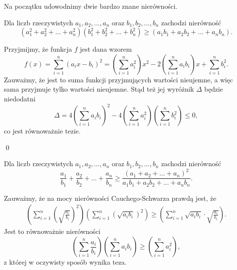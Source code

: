 

\noindent
Na początku udowodnimy dwie bardzo znane nierówności. 

\vspace{10px}


\noindent
Dla liczb rzeczywistych $a_1, a_2, ..., a_n$ oraz $b_1, b_2, ..., b_n$ zachodzi nierówność
\[
	\left(a_1^2 + a_2^2 + ... + a_n^2\right)\left(b_1^2 + b_2^2 + ... + b_n^2\right) \geqslant \left(a_1b_1 + a_2b_2 + ... + a_nb_n\right).
\]


\noindent
Przyjmijmy, że funkcja $f$ jest dana wzorem
\[
	f(x) = \sum^{n}_{i=1} (a_ix - b_i)^2 = \left(\sum^{n}_{i=1} a_i^2\right) x^2 - 2\left(\sum^{n}_{i=1} a_ib_i\right) x + \sum^{n}_{i=1} b_i^2.
\]
Zauważmy, że jest to suma funkcji przyjmujących wartości nieujemne, a więc sama przyjmuje tylko wartości nieujemne. Stąd też jej wyróżnik $\Delta$ będzie niedodatni
\[
	\Delta = 4\left(\sum^{n}_{i=1} a_ib_i\right)^2 - 4  \left(\sum^{n}_{i=1} a_i^2\right)  \left(\sum^{n}_{i=1} b_i^2\right) \leqslant 0,
\]
co jest równoważnie tezie.

\qed

\vspace{10px}



\noindent
Dla liczb rzeczywistych $a_1, a_2, ..., a_n$ oraz $b_1, b_2, ..., b_n$ zachodzi nierówność
\[
	\frac{a_1}{b_1} + \frac{a_2}{b_2} + ... + \frac{a_n}{b_n} \geqslant \frac{\left(a_1 + a_2 + ... + a_n\right)^2}{a_1b_1 + a_2b_2 + ... + a_nb_n}.
\]


\noindent
Zauważmy, że na mocy nierówności Cauchego-Schwarza prawdą jest, że
\begin{gather*}
	\left(\sum^{n}_{i = 1} \left(\sqrt{\frac{a_i}{b_i}}\right)^2 \right) \left(\sum^{n}_{i = 1} \left(\sqrt{a_ib_i}\right)^2 \right) \geqslant \left(\sum^{n}_{i = 1} \sqrt{a_ib_i} \cdot \sqrt{\frac{a_i}{b_i}} \right).
\end{gather*}
Jest to równoważnie nierówności
\[
	\left(\sum^{n}_{i = 1} \frac{a_i}{b_i} \right) \left(\sum^{n}_{i = 1} a_ib_i \right) \geqslant \left(\sum^{n}_{i = 1} a_i^2 \right),
\]
z której w oczywisty sposób wynika teza.

